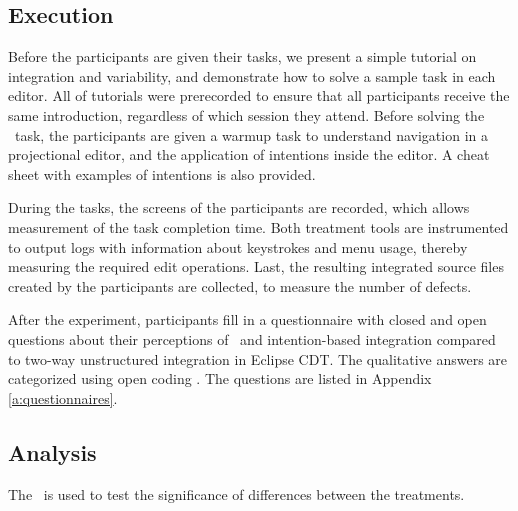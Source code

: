 \subsection{Execution}

Before the participants are given their tasks, we present a simple tutorial on integration and variability, and demonstrate how to solve a sample task in each editor. All of tutorials were prerecorded to ensure that all participants receive the same introduction, regardless of which session they attend. Before solving the \tooln~task, the participants are given a warmup task to understand navigation in a projectional editor, and the application of intentions inside the editor. A cheat sheet with examples of intentions is also provided.

During the tasks, the screens of the participants are recorded, which allows measurement of the task completion time. Both treatment tools are instrumented to output logs with information about keystrokes and menu usage, thereby measuring the required edit operations. Last, the resulting integrated source files created by the participants are collected, to measure the number of defects.

After the experiment, participants fill in a questionnaire with closed and open questions about their perceptions of \tooln~and intention-based integration compared to two-way unstructured integration in Eclipse CDT. The qualitative answers are categorized using open coding \cite{}. The questions are listed in Appendix \ref{a:questionnaires}.

\subsection{Analysis}
The \anova~is used to test the significance of differences between the treatments. 